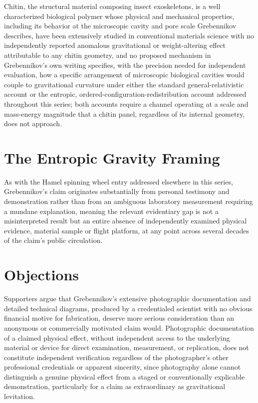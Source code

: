 \documentclass[11pt]{article}
\begin{document}
Chitin, the structural material composing insect exoskeletons, is a well characterized biological polymer whose physical and mechanical properties, including its behavior at the microscopic cavity and pore scale Grebennikov describes, have been extensively studied in conventional materials science with no independently reported anomalous gravitational or weight-altering effect attributable to any chitin geometry, and no proposed mechanism in Grebennikov's own writing specifies, with the precision needed for independent evaluation, how a specific arrangement of microscopic biological cavities would couple to gravitational curvature under either the standard general-relativistic account or the entropic, ordered-configuration-redistribution account addressed throughout this series; both accounts require a channel operating at a scale and mass-energy magnitude that a chitin panel, regardless of its internal geometry, does not approach.

\section{The Entropic Gravity Framing}

As with the Hamel spinning wheel entry addressed elsewhere in this series, Grebennikov's claim originates substantially from personal testimony and demonstration rather than from an ambiguous laboratory measurement requiring a mundane explanation, meaning the relevant evidentiary gap is not a misinterpreted result but an entire absence of independently examined physical evidence, material sample or flight platform, at any point across several decades of the claim's public circulation.

\section{Objections}

Supporters argue that Grebennikov's extensive photographic documentation and detailed technical diagrams, produced by a credentialed scientist with no obvious financial motive for fabrication, deserve more serious consideration than an anonymous or commercially motivated claim would. Photographic documentation of a claimed physical effect, without independent access to the underlying material or device for direct examination, measurement, or replication, does not constitute independent verification regardless of the photographer's other professional credentials or apparent sincerity, since photography alone cannot distinguish a genuine physical effect from a staged or conventionally explicable demonstration, particularly for a claim as extraordinary as gravitational levitation.
\end{document}
